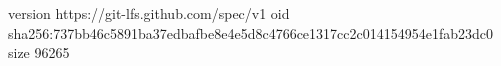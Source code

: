 version https://git-lfs.github.com/spec/v1
oid sha256:737bb46c5891ba37edbafbe8e4e5d8c4766ce1317cc2c014154954e1fab23dc0
size 96265
